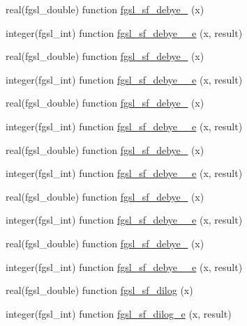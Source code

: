 \begin{DoxyCompactItemize}
\item 
real(fgsl\+\_\+double) function \hyperlink{specfunc_8finc_a4ef82c5fc8e68127eca8f0f2cdbde0bc}{fgsl\+\_\+sf\+\_\+debye\+\_} (x)
\item 
integer(fgsl\+\_\+int) function \hyperlink{specfunc_8finc_a2e5afb8111803eb0b2a7441de6a1170c}{fgsl\+\_\+sf\+\_\+debye\+\_\+\_\+e} (x, result)
\item 
real(fgsl\+\_\+double) function \hyperlink{specfunc_8finc_a62c2ce1dff2f2b1519304904b5b63904}{fgsl\+\_\+sf\+\_\+debye\+\_} (x)
\item 
integer(fgsl\+\_\+int) function \hyperlink{specfunc_8finc_af1e4dedb2969a56cb1fa064ba2afebcf}{fgsl\+\_\+sf\+\_\+debye\+\_\+\_\+e} (x, result)
\item 
real(fgsl\+\_\+double) function \hyperlink{specfunc_8finc_a0ba50e786951a7fcaaa8f6d742895764}{fgsl\+\_\+sf\+\_\+debye\+\_} (x)
\item 
integer(fgsl\+\_\+int) function \hyperlink{specfunc_8finc_aea530ad8b0a50d0364340ff2c08c2f72}{fgsl\+\_\+sf\+\_\+debye\+\_\+\_\+e} (x, result)
\item 
real(fgsl\+\_\+double) function \hyperlink{specfunc_8finc_ac9896ebe16c12552170b1508faae4eda}{fgsl\+\_\+sf\+\_\+debye\+\_} (x)
\item 
integer(fgsl\+\_\+int) function \hyperlink{specfunc_8finc_ab1c4c84cd96400fa02653332c3b476e5}{fgsl\+\_\+sf\+\_\+debye\+\_\+\_\+e} (x, result)
\item 
real(fgsl\+\_\+double) function \hyperlink{specfunc_8finc_aff618cd1aff8bcd5e91919ebd4587bdb}{fgsl\+\_\+sf\+\_\+debye\+\_} (x)
\item 
integer(fgsl\+\_\+int) function \hyperlink{specfunc_8finc_a5b10b4c227a519e516761c97d8235736}{fgsl\+\_\+sf\+\_\+debye\+\_\+\_\+e} (x, result)
\item 
real(fgsl\+\_\+double) function \hyperlink{specfunc_8finc_acfe1f2e0403e22af565ff0456a5bbae9}{fgsl\+\_\+sf\+\_\+debye\+\_} (x)
\item 
integer(fgsl\+\_\+int) function \hyperlink{specfunc_8finc_ad26350c3525af043e0d411b84233b51c}{fgsl\+\_\+sf\+\_\+debye\+\_\+\_\+e} (x, result)
\item 
real(fgsl\+\_\+double) function \hyperlink{specfunc_8finc_a556d535339f0a052f462ea518420e496}{fgsl\+\_\+sf\+\_\+dilog} (x)
\item 
integer(fgsl\+\_\+int) function \hyperlink{specfunc_8finc_a8c1b3284b3462ea295b41cbbf77dd5c2}{fgsl\+\_\+sf\+\_\+dilog\+\_\+e} (x, result)
\item 

\end{DoxyCompactItemize}
